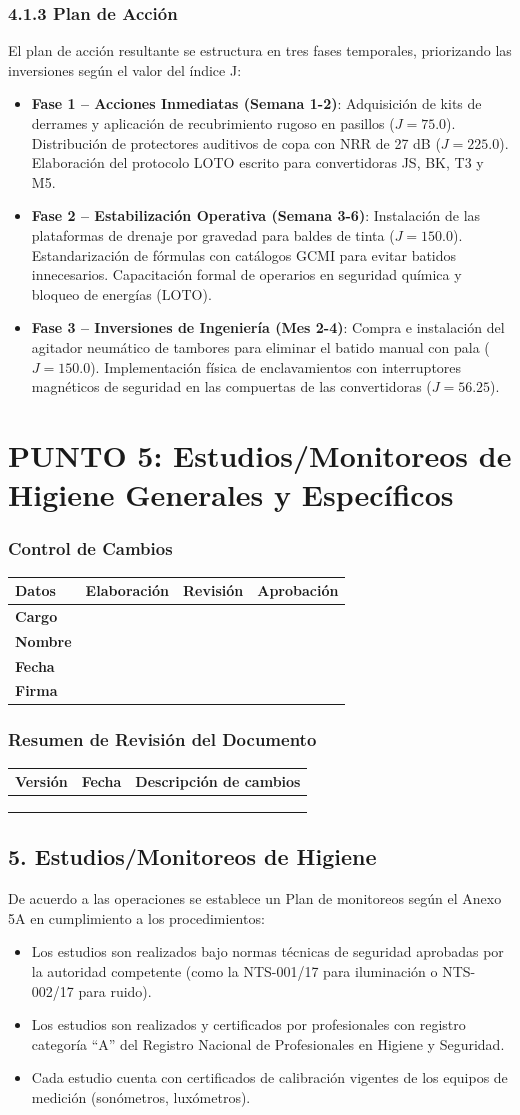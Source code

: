 \documentclass[11pt, letterpaper]{article}
\newcommand{\controlcambios}{
    \subsubsection*{Control de Cambios}
    \begin{table}[H]
        \centering
        \small
        \begin{tabular}{lp{4cm}p{4cm}p{4cm}}
            \toprule
            \textbf{Datos} & \textbf{Elaboración} & \textbf{Revisión} & \textbf{Aprobación} \\
            \midrule
            \textbf{Cargo} & & & \\
            \textbf{Nombre} & & & \\
            \textbf{Fecha} & & & \\
            \textbf{Firma} & & & \\
            \bottomrule
        \end{tabular}
    \end{table}
}
\newcommand{\resumenrevision}[1]{
    \subsubsection*{Resumen de Revisión del Documento}
    \begin{table}[H]
        \centering
        \small
        \begin{tabular}{ccp{8cm}}
            \toprule
            \textbf{Versión} & \textbf{Fecha} & \textbf{Descripción de cambios} \\
            \midrule
            #1 & & \\
            & & \\
            & & \\
            \bottomrule
        \end{tabular}
    \end{table}
}
\begin{document}
\subsubsection{4.1.3 Plan de Acción}
El plan de acción resultante se estructura en tres fases temporales, priorizando las inversiones según el valor del índice J:
\begin{itemize}
    \item \textbf{Fase 1 -- Acciones Inmediatas (Semana 1-2)}: Adquisición de kits de derrames y aplicación de recubrimiento rugoso en pasillos ($J=75.0$). Distribución de protectores auditivos de copa con NRR de 27 dB ($J=225.0$). Elaboración del protocolo LOTO escrito para convertidoras JS, BK, T3 y M5.
    \item \textbf{Fase 2 -- Estabilización Operativa (Semana 3-6)}: Instalación de las plataformas de drenaje por gravedad para baldes de tinta ($J=150.0$). Estandarización de fórmulas con catálogos GCMI para evitar batidos innecesarios. Capacitación formal de operarios en seguridad química y bloqueo de energías (LOTO).
    \item \textbf{Fase 3 -- Inversiones de Ingeniería (Mes 2-4)}: Compra e instalación del agitador neumático de tambores para eliminar el batido manual con pala ($J=150.0$). Implementación física de enclavamientos con interruptores magnéticos de seguridad en las compuertas de las convertidoras ($J=56.25$).
\end{itemize}

\newpage%
\section{PUNTO 5: Estudios/Monitoreos de Higiene Generales y Específicos}
\controlcambios
\resumenrevision{}

\subsection{5. Estudios/Monitoreos de Higiene}
De acuerdo a las operaciones se establece un Plan de monitoreos según el Anexo 5A en cumplimiento a los procedimientos:
\begin{itemize}
    \item Los estudios son realizados bajo normas técnicas de seguridad aprobadas por la autoridad competente (como la NTS-001/17 para iluminación o NTS-002/17 para ruido).
    \item Los estudios son realizados y certificados por profesionales con registro categoría ``A'' del Registro Nacional de Profesionales en Higiene y Seguridad.
    \item Cada estudio cuenta con certificados de calibración vigentes de los equipos de medición (sonómetros, luxómetros).
\end{itemize}
\end{document}
